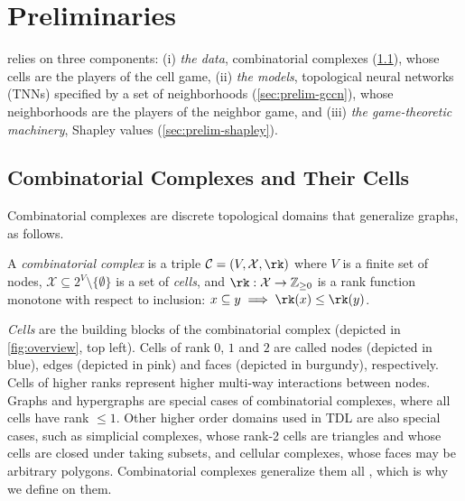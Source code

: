 \section{Preliminaries}
\label{sec:preliminaries}

\method relies on three components: (i) \textit{the data}, combinatorial complexes (\cref{sec:prelim-cc}), whose
cells are the players of the cell game, (ii) \textit{the models}, topological neural networks (TNNs) specified by a set of neighborhoods (\cref{sec:prelim-gccn}), whose neighborhoods
are the players of the neighbor game, and (iii) \textit{the game-theoretic machinery}, Shapley values (\cref{sec:prelim-shapley}).

\subsection{Combinatorial Complexes and Their Cells}
\label{sec:prelim-cc}

Combinatorial complexes are discrete topological domains that generalize graphs, as follows.

\begin{definition}
\label{def:cc}
A \emph{combinatorial complex} is a triple $\mathcal{C}=(V, \mathcal{X}, \rk)$ where
$V$ is a finite set of nodes, $\mathcal{X} \subseteq
2^{V}\setminus\{\emptyset\}$ is a set of \emph{cells}, and $\rk :
\mathcal{X} \to \mathbb{Z}_{\ge 0}$ is a rank function monotone with
respect to inclusion: $x \subseteq y \implies \rk(x) \le \rk(y)$.
\end{definition}

\textit{Cells} are the building blocks of the combinatorial complex (depicted in \cref{fig:overview}, top left). Cells of rank $0$, $1$ and $2$ are called nodes (depicted in blue), edges (depicted in pink) and faces (depicted in burgundy), respectively. Cells of higher ranks represent higher multi-way interactions between nodes. Graphs and hypergraphs are special cases of combinatorial complexes, where all cells have rank $\leq 1$. Other higher order domains used in TDL are also special cases, such as simplicial complexes, whose rank-2 cells are triangles and whose cells are closed under taking subsets, and cellular complexes, whose faces may be arbitrary polygons. Combinatorial complexes generalize them all \citep{hajij2023tdl}, which is why we define \method on them.

